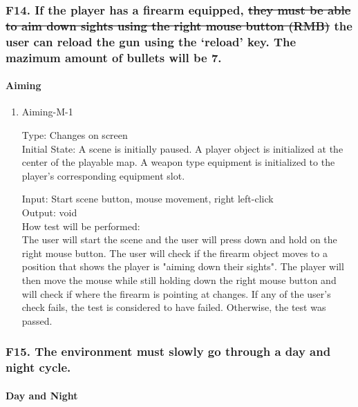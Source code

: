 \documentclass[12pt, titlepage]{article}
\DeclareRobustCommand{\hsout}[1]{\texorpdfstring{\sout{#1}}{#1}}
\newcounter{ftnum}
\begin{document}
\subsubsection{{\color{magenta} F14.} If the player has a firearm equipped, \hsout{they must be able to aim down sights using the right mouse button (RMB)} {\color{magenta} the user can reload the gun using the ‘reload’ key. The mazimum amount of bullets will be 7.}} 

\paragraph{Aiming}

\begin{enumerate}

\item{Aiming-M-1\\}  \label{F14-1}

Type: Changes on screen \\
					
Initial State: A scene is initially paused. A player object is initialized at the center of the playable map. A weapon type equipment is initialized to the player's corresponding equipment slot.
					
Input: Start scene button, mouse movement, right left-click\\
					
Output: void\\
					
How test will be performed:\\ The user will start the scene and the user will press down and hold on the right mouse button. The user will check if the firearm object moves to a position that shows the player is "aiming down their sights". The player will then move the mouse while still holding down the right mouse button and will check if where the firearm is pointing at changes. If any of the user's check fails, the test is considered to have failed. Otherwise, the test was passed. \\

\end{enumerate}

\subsubsection{{\color{magenta} F15.} The environment must slowly go through a day and night cycle.} 

\paragraph{Day and Night}
\end{document}
